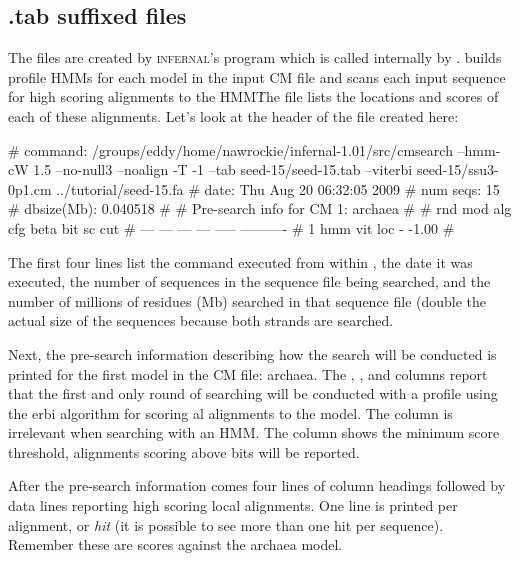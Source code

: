 \subsection{.tab suffixed files}

The  files are created by \textsc{infernal}'s
 program which is called internally by
.  builds profile HMMs for each model
in the input CM file and scans each input sequence for high scoring
alignments to the HMM\. The  file lists the locations and
scores of each of these alignments. Let's look at the header of the 
 file created here:

\begin{sreoutput}
# command:    /groups/eddy/home/nawrockie/infernal-1.01/src/cmsearch --hmm-cW 1.5 --no-null3 --noalign -T -1 --tab seed-15/seed-15.tab --viterbi seed-15/ssu3-0p1.cm ../tutorial/seed-15.fa
# date:       Thu Aug 20 06:32:05 2009
# num seqs:   15
# dbsize(Mb): 0.040518
#
# Pre-search info for CM 1: archaea
#
# rnd  mod  alg  cfg   beta  bit sc cut
# ---  ---  ---  ---  -----  ----------
#   1  hmm  vit  loc      -       -1.00
#
\end{sreoutput}

The first four lines list the  command executed from
within , the date it was executed, the number of
sequences in the sequence file being searched, and the number of
millions of residues (Mb) searched in that sequence file (double the
actual size of the sequences because both strands are searched.

Next, the pre-search information describing how the search will be
conducted is printed for the first model in the CM file: archaea. 
The , ,  and  columns report
that the first and only round of searching will be conducted with a
profile  using the erbi algorithm for scoring
al alignments to the model. The 
column is irrelevant when searching with an HMM. The 
column shows the minimum score threshold, alignments scoring above
 bits will be reported.

After the pre-search information comes four lines of column headings
followed by data lines reporting high scoring local alignments. One
line is printed per alignment, or \emph{hit} (it is possible to see
more than one hit per sequence). Remember these are scores against the
archaea model.

